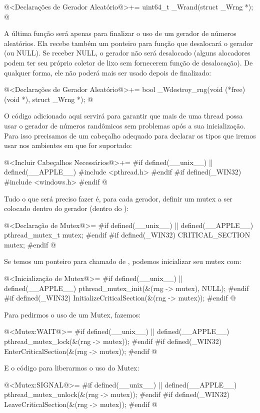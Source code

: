 \iniciocodigo
@<Declarações de Gerador Aleatório@>+=
uint64_t _Wrand(struct _Wrng *);
@
\fimcodigo

A última função será apenas para finalizar o uso de um gerador de
números aleatórios. Ela recebe também um ponteiro para função que
desalocará o gerador (ou NULL). Se receber NULL, o gerador não será
desalocado (alguns alocadores podem ter seu próprio coletor de lixo
sem fornecerem função de desalocação). De qualquer forma, ele não
poderá mais ser usado depois de finalizado:

\iniciocodigo
@<Declarações de Gerador Aleatório@>+=
bool _Wdestroy_rng(void (*free)(void *), struct _Wrng *);
@
\fimcodigo


O código adicionado aqui servirá para garantir que mais de uma thread
possa usar o gerador de números randômicos sem problemas após a sua
inicialização. Para isso precisamos de um cabeçalho adequado para
declarar os tipos que iremos usar nos ambientes em que for suportado:

\iniciocodigo
@<Incluir Cabeçalhos Necessários@>+=
#if defined(__unix__) || defined(__APPLE__)
#include <pthread.h>
#endif
#if defined(_WIN32)
#include <windows.h>
#endif
@
\fimcodigo

Tudo o que será preciso fazer é, para cada gerador, definir um mutex a
ser colocado dentro do gerador (dentro do ):

\iniciocodigo
@<Declaração de Mutex@>=
#if defined(__unix__) || defined(__APPLE__)
pthread_mutex_t mutex;
#endif
#if defined(_WIN32)
CRITICAL_SECTION mutex;
#endif
@
\fimcodigo

Se temos um ponteiro para  chamado
de , podemos inicializar seu mutex com:

\iniciocodigo
@<Inicialização de Mutex@>=
#if defined(__unix__) || defined(__APPLE__)
pthread_mutex_init(&(rng -> mutex), NULL);
#endif
#if defined(_WIN32)
InitializeCriticalSection(&(rng -> mutex));
#endif
@
\fimcodigo

Para pedirmos o uso de um Mutex, fazemos:

\iniciocodigo
@<Mutex:WAIT@>=
#if defined(__unix__) || defined(__APPLE__)
pthread_mutex_lock(&(rng -> mutex));
#endif
#if defined(_WIN32)
EnterCriticalSection(&(rng -> mutex));
#endif
@
\fimcodigo

E o código para liberarmos o uso do Mutex:

\iniciocodigo
@<Mutex:SIGNAL@>=
#if defined(__unix__) || defined(__APPLE__)
pthread_mutex_unlock(&(rng -> mutex));
#endif
#if defined(_WIN32)
LeaveCriticalSection(&(rng -> mutex));
#endif
@
\fimcodigo

